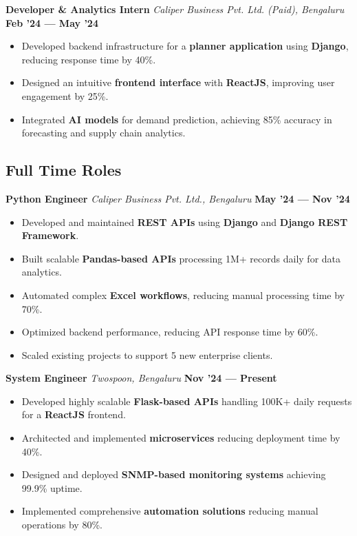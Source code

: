 \documentclass[a4paper,10pt]{article}
\begin{document}
\vspace{0.5em}

\textbf{Developer \& Analytics Intern} \hfill
\textit{Caliper Business Pvt. Ltd. (Paid), Bengaluru} \hfill \textbf{Feb '24 --- May '24}
\begin{itemize}
    \item Developed backend infrastructure for a \textbf{planner application} using \textbf{Django}, reducing response time by 40\%.
    \item Designed an intuitive \textbf{frontend interface} with \textbf{ReactJS}, improving user engagement by 25\%.
    \item Integrated \textbf{AI models} for demand prediction, achieving 85\% accuracy in forecasting and supply chain analytics.
\end{itemize}

\vspace{0.5em}

\subsection*{Full Time Roles}

\textbf{Python Engineer} \hfill
\textit{Caliper Business Pvt. Ltd., Bengaluru} \hfill \textbf{May '24 --- Nov '24}
\begin{itemize}
    \item Developed and maintained \textbf{REST APIs} using \textbf{Django} and \textbf{Django REST Framework}.
    \item Built scalable \textbf{Pandas-based APIs} processing 1M+ records daily for data analytics.
    \item Automated complex \textbf{Excel workflows}, reducing manual processing time by 70\%.
    \item Optimized backend performance, reducing API response time by 60\%.
    \item Scaled existing projects to support 5 new enterprise clients.
\end{itemize}

\textbf{System Engineer} \hfill
\textit{Twospoon, Bengaluru} \hfill \textbf{Nov '24 --- Present}
\begin{itemize}
    \item Developed highly scalable \textbf{Flask-based APIs} handling 100K+ daily requests for a \textbf{ReactJS} frontend.
    \item Architected and implemented \textbf{microservices} reducing deployment time by 40\%.
    \item Designed and deployed \textbf{SNMP-based monitoring systems} achieving 99.9\% uptime.
    \item Implemented comprehensive \textbf{automation solutions} reducing manual operations by 80\%.
\end{itemize}
\vspace{0.5em}
\end{document}
